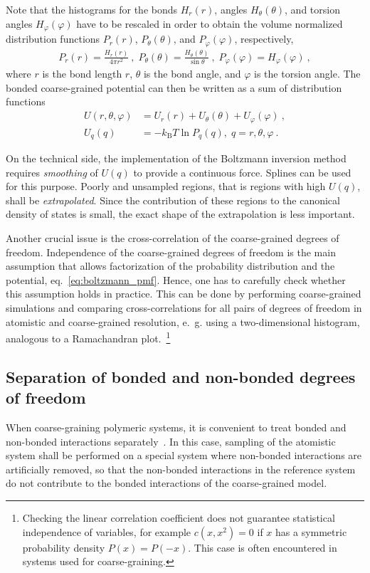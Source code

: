 Note that the histograms for the bonds $H_r(r)$, angles $H_\theta(\theta)$, and torsion angles $H_\varphi(\varphi)$ have to be rescaled in order to obtain the volume normalized distribution functions $P_r(r)$, $P_\theta(\theta)$, and $P_\varphi(\varphi)$, respectively,
%
\begin{align}
    P_r(r) = \frac{H_r(r)}{4\pi r^2}~,\;
    P_\theta(\theta) = \frac{H_\theta(\theta)}{\sin \theta}~,\;
    P_\varphi(\varphi) = H_\varphi (\varphi)~,
    \label{eq:boltzmann_norm}
\end{align}
where $r$ is the bond length $r$, $\theta$ is the bond angle, and $\varphi$ is the torsion angle. The bonded coarse-grained potential can then be written as a sum of distribution functions
%
\begin{align}
    \label{eq:boltzmann_pmf}
    U({r}, \theta, \varphi) &= U_r({r}) + U_{\theta}(\theta) + U_{\varphi}(\varphi)~, \\
    U_q({q}) &= - k_\text{B} T \ln P_q( q ),\; q=r, \theta, \varphi~.
    \nonumber
\end{align}

On the technical side, the implementation of the Boltzmann inversion method requires {\em smoothing} of $U(q)$ to provide a continuous force. Splines can be used for this purpose. Poorly and unsampled regions, that is regions with high $U(q)$, shall be {\em extrapolated}. Since the contribution of these regions to the canonical density of states is small, the exact shape of the extrapolation is less important.

Another crucial issue is the cross-correlation of the coarse-grained degrees of freedom. Independence of the coarse-grained degrees of freedom is the main assumption that allows factorization of the probability distribution and the potential, eq.~\ref{eq:boltzmann_pmf}. Hence, one has to carefully check whether this assumption holds in practice. This can be done by performing coarse-grained simulations and comparing cross-correlations for all pairs of degrees of freedom in atomistic and coarse-grained resolution, e.~g. using a two-dimensional histogram, analogous to a Ramachandran plot.~\footnote{Checking the linear correlation coefficient does not guarantee statistical independence of variables, for example $c(x, x^2)=0$ if $x$ has a symmetric probability density $P(x) = P(-x)$. This case is often encountered in systems used for coarse-graining.}

\subsection{Separation of bonded and non-bonded degrees of freedom}
When coarse-graining polymeric systems, it is convenient to treat bonded and non-bonded interactions separately~\cite{Tschoep:1998}. In this case, sampling of the atomistic system shall be performed on a special system where non-bonded interactions are artificially removed, so that the non-bonded interactions in the reference system do not contribute to the bonded interactions of the coarse-grained model.

